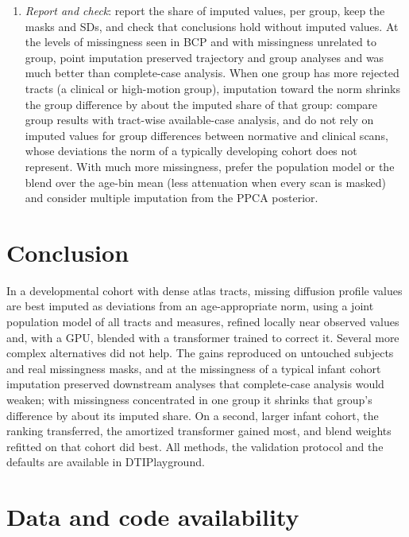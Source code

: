 \documentclass[11pt]{article}
\begin{document}
\begin{enumerate}
slightly in the thin 0--3 month bin, 0.977 [0.955, 0.999]; E5, Table~\ref{tab:e5}), preferably after bringing both cohorts to a common age scale (chronological vs
term-corrected or postmenstrual age).
\item \emph{Report and check}: report the share of imputed values, per group, keep the masks and SDs, and check that
conclusions hold without imputed values. At the levels of missingness seen in BCP and with missingness unrelated to
group, point imputation preserved trajectory and group analyses and was much better than complete-case analysis. When
one group has more rejected tracts (a clinical or high-motion group), imputation toward the norm shrinks the group
difference by about the imputed share of that group: compare group results with tract-wise available-case analysis, and
do not rely on imputed values for group differences between normative and clinical scans, whose deviations the norm of a
typically developing cohort does not represent. With much more missingness, prefer the population model or the blend
over the age-bin mean (less attenuation when every scan is masked) and consider multiple imputation from the PPCA
posterior.
\end{enumerate}

\section{Conclusion}

In a developmental cohort with dense atlas tracts, missing diffusion profile values are best imputed as deviations from
an age-appropriate norm, using a joint population model of all tracts and measures, refined locally near observed values
and, with a GPU, blended with a transformer trained to correct it. Several more complex alternatives did not help.
The gains reproduced on untouched subjects and real missingness masks, and at the missingness of a typical infant
cohort imputation preserved downstream analyses that complete-case analysis would weaken; with missingness concentrated in
one group it shrinks that group's difference by about its imputed share. On a second, larger infant cohort, the ranking
transferred, the amortized transformer gained most, and blend weights refitted on that cohort did best. All methods, the validation protocol and the defaults are available in DTIPlayground.

\section*{Data and code availability}
\end{document}
